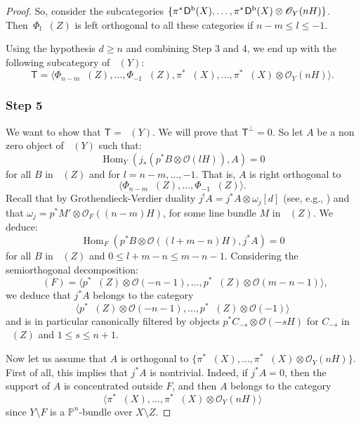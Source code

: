 \documentclass[JEP,XML,SOM,Unicode,NoEqCountersInSection]{cedram}
\let\mathcal\mathscr
\theoremstyle{plain}
\theoremstyle{definition}
\newcommand{\cat}[1]{\mathsf{#1}}
\newcommand{\sod}[1]{\langle #1 \rangle}
\DeclareMathOperator{\Db}{{\cat{D}^{\mathrm{b}}}}
\DeclareMathOperator{\Hom}{Hom}
\newcommand{\PP}{\mathbb{P}}
\newcommand{\sheaf}[1]{\mathcal{#1}}
\newcommand{\ko}{\sheaf{O}}\let\OO\ko\let\cO\ko
\begin{document}
\begin{proof}
So, consider the subcategories $\{ \pi^*\mkern-2mu \Db(X),\ldots, \pi^* \mkern-2mu\Db(X)\otimes \ko_Y(nH)\}$. Then~$\Phi_l \Db(Z)$ is left orthogonal to all these categories if
$n-m \leq l \leq -1$.

Using the hypothesis $d \geq n$ and combining Step 3 and 4,
we end up with the following subcategory of $\Db(Y)$:
\[
\cat{T}=\sod{\Phi_{n-m}\Db(Z),\ldots,\Phi_{-1}\Db(Z),\pi^*\Db(X),\ldots,\pi^*\Db(X)\otimes \ko_Y(nH)}.
\]

\subsubsection*{Step 5}
We want to show that $\cat{T}=\Db(Y)$. We will prove that $\cat{T}^\perp=0$. So let $A$ be a non zero object of $\Db(Y)$ such that:\vspace*{-3pt}
\begin{equation*}\label{eq:orthogonal-to-PHIl}
\Hom_Y(j_*(p^* B \otimes \ko(lH)),A)=0
\end{equation*}
for all $B$ in $\Db(Z)$ and for $l=n-m,\ldots,-1$. That is, $A$ is right orthogonal to\vspace*{-3pt}
\[
\sod{\Phi_{n-m}\Db(Z),\ldots,\Phi_{-1}\Db(Z)}.
\]
Recall that by Grothendieck-Verdier duality $j^!A=j^*A \otimes \omega_j [d]$ (see, e.g., \cite[Cor.\,3.38]{Huybook}) and that
$\omega_j = p^*M' \otimes \ko_F((n-m)H)$, for some
line bundle $M$ in $\Db(Z)$.
We deduce:\vspace*{-3pt}
\[
\Hom_F(p^*B \otimes \ko((l+m-n)H),j^*A)= 0
\]
for all $B$ in $\Db(Z)$ and $0 \leq l+m-n \leq m-n-1$. Considering the semiorthogonal decomposition:\vspace*{-3pt}
\[
\Db(F) =\sod{p^*\Db(Z)\otimes \ko(-n-1),\ldots,p^*\Db(Z)\otimes \ko(m-n-1)},
\]
we deduce that $j^*A$ belongs to the category\vspace*{-3pt}
\[
\sod{p^*\Db(Z)\otimes \ko(-n-1),\ldots,p^*\Db(Z)\otimes \ko(-1)}
\]
and is in particular canonically filtered by objects $p^*C_{-s} \otimes \ko(-sH)$ for
$C_{-s}$ in $\Db(Z)$ and $1 \leq s \leq n+1$.

Now let us assume that $A$ is orthogonal to $\{\pi^*\Db(X),\ldots,\pi^*\Db(X)\otimes \ko_Y(nH)\}$.
First of all, this implies that $j^*A$ is nontrivial. Indeed, if $j^*A = 0$, then the support of $A$
is concentrated outside $F$, and then $A$ belongs to
the category\vspace*{-3pt}
\[
\sod{\pi^*\Db(X),\ldots,\pi^*\Db(X)\otimes \ko_Y(nH)}
\]
since $Y \setminus F$ is a $\PP^n$-bundle over $X \setminus Z$.


\end{proof}
\end{document}
